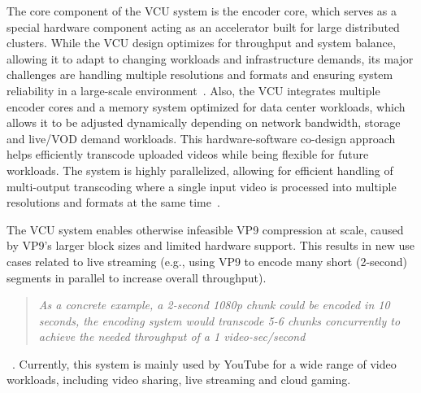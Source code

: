 The core component of the \ac{VCU} system is the encoder core, which serves as a special hardware component acting as an accelerator built for large distributed clusters. 
While the \ac{VCU} design optimizes for throughput and system balance, allowing it to adapt to changing workloads and infrastructure demands, its major challenges are handling multiple resolutions and formats and ensuring system reliability in a large-scale environment~\parencite{youtube_vpu}.
Also, the \ac{VCU} integrates multiple encoder cores and a memory system optimized for data center workloads, which allows it to be adjusted dynamically depending on network bandwidth, storage and live/\ac{VOD} demand workloads. This hardware-software co-design approach helps efficiently transcode uploaded videos while being flexible for future workloads. The system is highly parallelized, allowing for efficient handling of multi-output transcoding where a single input video is processed into multiple resolutions and formats at the same time~\parencite{youtube_vpu}.

The \ac{VCU} system enables otherwise infeasible VP9 compression at scale, caused by VP9's larger block sizes and limited hardware support. This results in new use cases related to live streaming (e.g., using VP9 to encode many short (2-second) segments in parallel to increase overall throughput). \blockquote{\textit{As a concrete example, a 2-second 1080p chunk could be encoded in 10 seconds, the encoding system would transcode 5-6 chunks concurrently to achieve the needed throughput of a 1 video-sec/second}}~\parencite{youtube_vpu}.
Currently, this system is mainly used by YouTube for a wide range of video workloads, including video sharing, live streaming and cloud gaming. 